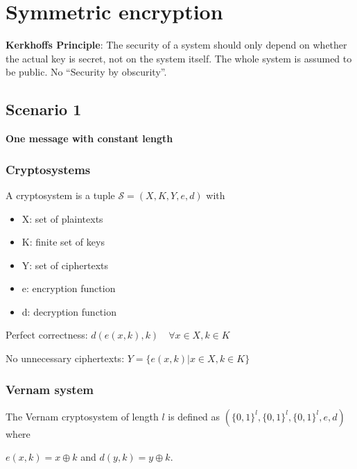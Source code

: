 \tableofcontents
\newpage

\hypertarget{symmetric-encryption}{%
\section{Symmetric encryption}\label{symmetric-encryption}}

\textbf{Kerkhoffs Principle}: The security of a system should only
depend on whether the actual key is secret, not on the system itself.
The whole system is assumed to be public. No ``Security by obscurity''.

\hypertarget{scenario-1}{%
\subsection{Scenario 1}\label{scenario-1}}

\textbf{One message with constant length}

\hypertarget{cryptosystems}{%
\subsubsection{Cryptosystems}\label{cryptosystems}}

A cryptosystem is a tuple \(\mathcal{S} = (X, K, Y, e, d)\) with

\begin{itemize}
\tightlist
\item
  X: set of plaintexts
\item
  K: finite set of keys
\item
  Y: set of ciphertexts
\item
  e: encryption function
\item
  d: decryption function
\end{itemize}

Perfect correctness:
\tab\tab \(d(e(x, k), k) \quad \forall x \in X, k \in K\)

No unnecessary ciphertexts: \tab \(Y = \{e(x,k) | x \in X, k \in K\}\)

\hypertarget{vernam-system}{%
\subsubsection{Vernam system}\label{vernam-system}}

The Vernam cryptosystem of length \(l\) is defined as
\((\{0, 1\}^l, \{0, 1\}^l, \{0, 1\}^l, e, d)\) where

\(e(x, k) = x \oplus k\) and \(d(y, k) = y \oplus k\).


